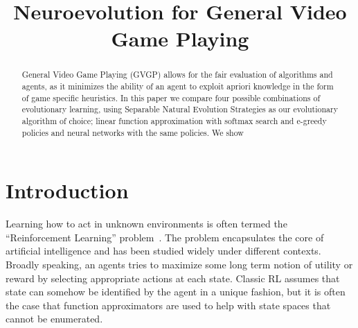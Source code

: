\documentclass[conference]{IEEEtran}
\begin{document}
%
\title{Neuroevolution for General Video Game Playing}

\author{
}


\maketitle


\begin{abstract}
General Video Game Playing (GVGP) allows for the fair evaluation of algorithms and agents, as it minimizes the ability of an agent to exploit apriori knowledge in the form of game specific heuristics. In this paper we compare four possible combinations of evolutionary learning, using Separable Natural Evolution Strategies as our evolutionary algorithm of choice; linear function approximation with softmax search and e-greedy policies and neural networks with the same policies. We show 

\end{abstract}

\IEEEpeerreviewmaketitle

\section{Introduction} \label{sec:intro}

Learning how to act in unknown environments is often termed the ``Reinforcement Learning'' problem~\cite{sutton1998introduction}. The problem encapsulates the core of artificial intelligence and has been studied widely under different contexts. Broadly speaking, an agents tries to maximize some long term notion of utility or reward by selecting appropriate actions at each state. Classic RL assumes that state can somehow be identified by the agent in a unique fashion, but it is often the case that function approximators are used to help with state spaces that cannot be enumerated. 
\end{document}
